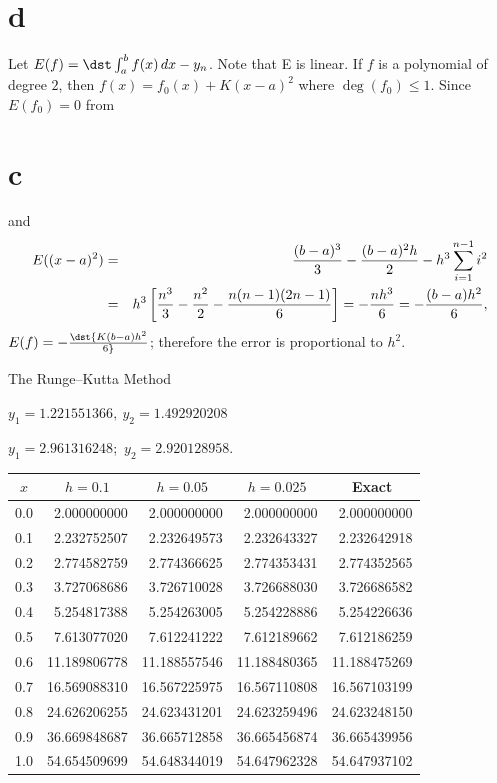 \documentclass[dvips]{book}
\renewcommand{\exer}[1]{\par\medskip\;\noindent{\color{red}\bf #1.}}
\numberwithin{example}{section}
\numberwithin{equation}{section}
\numberwithin{theorem}{section}
\numberwithin{table}{section}
\numberwithin{figure}{section}
\begin{document}
\part{d}
Let
$E(f)=\dst\int_a^bf(x)\,dx-y_n$.  Note that E is linear.
If $f$ is a polynomial of degree $2$, then $f(x)=f_0(x)+K(x-a)^2$
where $\deg(f_0)\le1$. Since
$E(f_0)=0$ from \part{c} and
\begin{eqnarray*}
E((x-a)^2)&=&{(b-a)^3\over3}-{(b-a)^2h\over2}-h^3\sum_{i=1}^{n-1}i^2\\
&=&h^3\left[{n^3\over3}-{n^2\over2}-{n(n-1)(2n-1)\over6}\right]
=-{nh^3\over6}=-{(b-a)h^2\over6},
\end{eqnarray*}
$E(f)=-\dst{K(b-a)h^2\over6}$; therefore the error is proportional
to  $h^2$.


{The Runge--Kutta Method}
\renewcommand{\thissection}{}
\thissection

\vspace{-15pt}



\exer{3.3.2}
$y_1=1.221551366,\ y_2=1.492920208$


\exer{3.3.4}
$ y_1=2.961316248$;\ $ y_2=2.920128958$.



\exer{3.3.6}
{\small
\begin{tabular}{|c|r|r|r|r|}\hline
\multicolumn{1}{|c|}{$x$}&
\multicolumn{1}{|c|}{$h=0.1$}&
\multicolumn{1}{|c|}{$h=0.05$}&
\multicolumn{1}{|c|}{$h=0.025$}&
\multicolumn{1}{|c|}{Exact}\\ \hline
0.0 &   2.000000000 &  2.000000000 &  2.000000000 &   2.000000000 \\
0.1 &   2.232752507 &  2.232649573 &  2.232643327 &   2.232642918 \\
0.2 &   2.774582759 &  2.774366625 &  2.774353431 &   2.774352565 \\
0.3 &   3.727068686 &  3.726710028 &  3.726688030 &   3.726686582 \\
0.4 &   5.254817388 &  5.254263005 &  5.254228886 &   5.254226636 \\
0.5 &   7.613077020 &  7.612241222 &  7.612189662 &   7.612186259 \\
0.6 &  11.189806778 & 11.188557546 & 11.188480365 &  11.188475269 \\
0.7 &  16.569088310 & 16.567225975 & 16.567110808 &  16.567103199 \\
0.8 &  24.626206255 & 24.623431201 & 24.623259496 &  24.623248150 \\
0.9 &  36.669848687 & 36.665712858 & 36.665456874 &  36.665439956 \\
1.0 &  54.654509699 & 54.648344019 & 54.647962328 &  54.647937102 \\
\hline
\end{tabular}}
\end{document}
